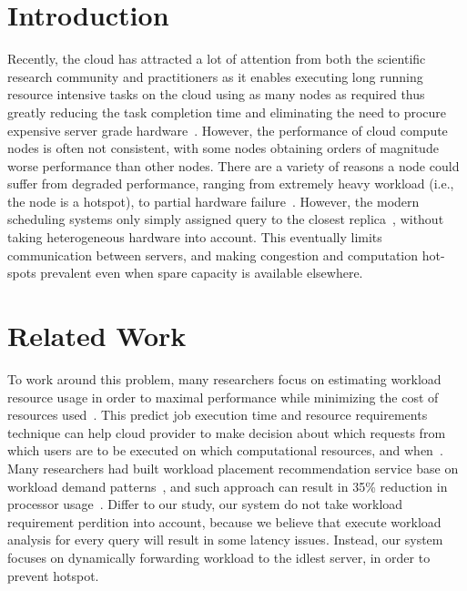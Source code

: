 \section{Introduction}

Recently, the cloud has attracted a lot of attention from both the scientific research community and practitioners as it enables executing long running resource intensive tasks on the cloud using as many nodes as required thus greatly reducing the task completion time and eliminating the need to procure expensive server grade hardware~\cite{Agrawal:2008:CRD:1462571.1462573}. However, the performance of cloud compute nodes is often not consistent, with some nodes obtaining orders of magnitude worse performance than other nodes. There are a variety of reasons a node could suffer from degraded performance, ranging from extremely heavy workload (i.e., the node is a hotspot), to partial hardware failure~\cite{citeulike:6656195}. However, the modern scheduling systems only simply assigned query to the closest replica~\cite{borthakur-07}, without taking heterogeneous hardware into account. This eventually limits communication between servers, and making congestion and computation hot-spots prevalent even when spare capacity is available elsewhere.

\section{Related Work}

To work around this problem, many researchers focus on estimating workload resource usage in order to maximal performance while minimizing the cost of resources used~\cite{citeulike:6656217,5452742,curino2011relational, MIT-Relational}. This predict job execution time and resource requirements technique can help cloud provider to make decision about which requests from which users are to be executed on which computational resources, and when~\cite{citeulike:6656217}. Many researchers had built workload placement recommendation service base on workload demand patterns~\cite{Gmach:2007:WAD:1524302.1524818, Atikoglu:2012:WAL:2254756.2254766}, and such approach can result in 35\% reduction in processor usage~\cite{Gmach:2007:WAD:1524302.1524818}. Differ to our study, our system do not take workload requirement perdition into account, because we believe that execute workload analysis for every query will result in some latency issues. Instead, our system focuses on dynamically forwarding workload to the idlest server, in order to prevent hotspot.
 
